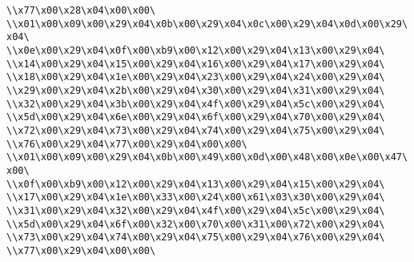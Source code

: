 \verb|\\x77\x00\x28\x04\x00\x00\|\newline
\verb|\\x01\x00\x09\x00\x29\x04\x0b\x00\x29\x04\x0c\x00\x29\x04\x0d\x00\x29\x04\|\newline
\verb|\\x0e\x00\x29\x04\x0f\x00\xb9\x00\x12\x00\x29\x04\x13\x00\x29\x04\|\newline
\verb|\\x14\x00\x29\x04\x15\x00\x29\x04\x16\x00\x29\x04\x17\x00\x29\x04\|\newline
\verb|\\x18\x00\x29\x04\x1e\x00\x29\x04\x23\x00\x29\x04\x24\x00\x29\x04\|\newline
\verb|\\x29\x00\x29\x04\x2b\x00\x29\x04\x30\x00\x29\x04\x31\x00\x29\x04\|\newline
\verb|\\x32\x00\x29\x04\x3b\x00\x29\x04\x4f\x00\x29\x04\x5c\x00\x29\x04\|\newline
\verb|\\x5d\x00\x29\x04\x6e\x00\x29\x04\x6f\x00\x29\x04\x70\x00\x29\x04\|\newline
\verb|\\x72\x00\x29\x04\x73\x00\x29\x04\x74\x00\x29\x04\x75\x00\x29\x04\|\newline
\verb|\\x76\x00\x29\x04\x77\x00\x29\x04\x00\x00\|\newline
\verb|\\x01\x00\x09\x00\x29\x04\x0b\x00\x49\x00\x0d\x00\x48\x00\x0e\x00\x47\x00\|\newline
\verb|\\x0f\x00\xb9\x00\x12\x00\x29\x04\x13\x00\x29\x04\x15\x00\x29\x04\|\newline
\verb|\\x17\x00\x29\x04\x1e\x00\x33\x00\x24\x00\x61\x03\x30\x00\x29\x04\|\newline
\verb|\\x31\x00\x29\x04\x32\x00\x29\x04\x4f\x00\x29\x04\x5c\x00\x29\x04\|\newline
\verb|\\x5d\x00\x29\x04\x6f\x00\x32\x00\x70\x00\x31\x00\x72\x00\x29\x04\|\newline
\verb|\\x73\x00\x29\x04\x74\x00\x29\x04\x75\x00\x29\x04\x76\x00\x29\x04\|\newline
\verb|\\x77\x00\x29\x04\x00\x00\|\newline

